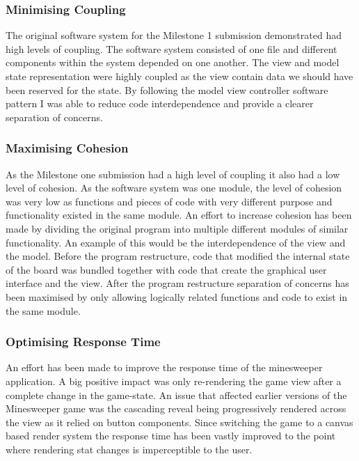 \documentclass[12pt, a4]{report}
\begin{document}
\subsubsection{Minimising Coupling}
The original software system for the Milestone 1 submission demonstrated had high levels of coupling. The software system consisted of one file and different components within the system depended on one another. The view and model state representation were highly coupled as the view contain data we should have been reserved for the state. By following the model view controller software pattern I was able to reduce code interdependence and provide a clearer separation of concerns.


\subsubsection{Maximising Cohesion}
As the Milestone one submission had a high level of coupling it also had a low level of cohesion. As the software system was one module, the level of cohesion was very low as functions and pieces of code with very different purpose and functionality existed in the same module. An effort to increase cohesion has been made by dividing the original program into multiple different modules of similar functionality. An example of this would be the interdependence of the view and the model. Before the program restructure, code that modified the internal state of the board was bundled together with code that create the graphical user interface and the view. After the program restructure separation of concerns has been maximised by only allowing logically related functions and code to exist in the same module.

\subsubsection{Optimising Response Time}
An effort has been made to improve the response time of the minesweeper application. A big positive impact was only re-rendering the game view after a complete change in the game-state. An issue that affected earlier versions of the Minesweeper game was the cascading reveal being progressively rendered across the view as it relied on button components. Since switching the game to a canvas based render system the response time has been vastly improved to the point where rendering stat changes is imperceptible to the user.
\end{document}
